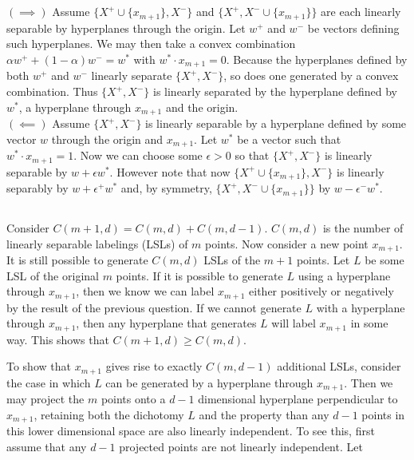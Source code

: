 \documentclass[]{article}
\begin{document}
\subsection{}

$(\implies)$ Assume $\lbrace X^+ \cup \lbrace x_{m+1} \rbrace, X^- \rbrace$ and $\lbrace X^+, X^- \cup \lbrace x_{m+1}\rbrace \rbrace$ are each linearly separable by hyperplanes through the origin. Let $w^+$ and $w^-$ be vectors defining such hyperplanes. We may then take a convex combination $\alpha  w^+ + (1-\alpha) w^- = w^*$ with $w^* \cdot x_{m+1} = 0$. Because the hyperplanes defined by both $w^+$ and $w^-$ linearly separate $\lbrace X^+, X^- \rbrace$, so does one generated by a convex combination. Thus $\lbrace X^+, X^- \rbrace$ is linearly separated by the hyperplane defined by $w^*$, a hyperplane through $x_{m+1}$ and the origin.\\

\noindent$(\impliedby)$ Assume $\lbrace X^+, X^- \rbrace$ is linearly separable by a hyperplane defined by some vector $w$ through the origin and $x_{m+1}$. Let $w^*$ be a vector such that $w^* \cdot x_{m+1} = 1$. Now we can choose some $\epsilon > 0$ so that $\lbrace X^+, X^- \rbrace$ is linearly separable by $w + \epsilon w^*$. However note that now $\lbrace X^+ \cup \lbrace x_{m+1} \rbrace, X^- \rbrace$ is linearly separably by $w + \epsilon^+ w^*$ and, by symmetry, $\lbrace X^+, X^- \cup \lbrace x_{m+1}\rbrace \rbrace$ by $w - \epsilon^- w^*$.
\subsection{}

Consider $C(m+1,d)=C(m,d) + C(m,d-1)$. $C(m,d)$ is the number of linearly separable labelings (LSLs) of $m$ points. Now consider a new point $x_{m+1}$. It is still possible to generate $C(m,d)$ LSLs of the $m+1$ points. Let $L$ be some LSL of the original $m$ points. If it is possible to generate $L$ using a hyperplane through $x_{m+1}$, then we know we can label $x_{m+1}$ either positively or negatively by the result of the previous question. If we cannot generate $L$ with a hyperplane through $x_{m+1}$, then any hyperplane that generates $L$ will label $x_{m+1}$ in some way. This shows that $C(m+1,d) \ge C(m,d)$.

To show that $x_{m+1}$ gives rise to exactly $C(m,d-1)$ additional LSLs, consider the case in which $L$ can be generated by a hyperplane through $x_{m+1}$. Then we may project the $m$ points onto a $d-1$ dimensional hyperplane perpendicular to $x_{m+1}$, retaining both the dichotomy $L$ and the property than any $d-1$ points in this lower dimensional space are also linearly independent. To see this, first assume that any $d-1$ projected points are not linearly independent. Let\\
\end{document}
